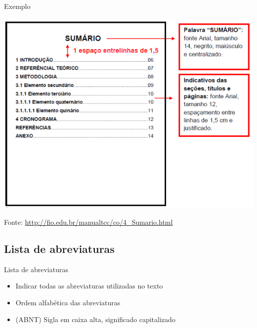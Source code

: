 \documentclass{beamer}
\begin{document}
\begin{frame}{\scriptsize }
  \begin{exampleblock}{Exemplo}
    \begin{center}
      \includegraphics[height=0.8\textheight]{EstruturaII/sumario}
    \end{center}
  \end{exampleblock}

  \vfill
  \scriptsize
  \hfill Fonte: {\tiny \url{http://fio.edu.br/manualtcc/co/4_Sumario.html}}
\end{frame}

\subsection{Lista de abreviaturas}

\begin{frame}{\scriptsize Lista de abreviaturas}
  \begin{itemize}
    \footnotesize
  \item Indicar \alert{todas} as abreviaturas utilizadas no texto
    \bigskip
  \item Ordem alfabética das abreviaturas
    \bigskip
  \item (ABNT) Sigla em caixa alta, significado capitalizado
  \end{itemize}
\end{frame}
\end{document}
